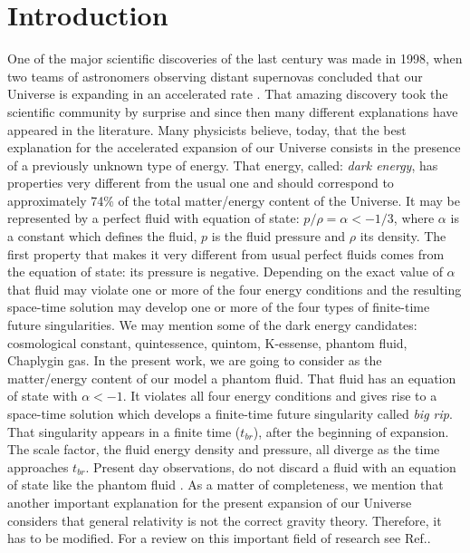 \documentclass[12pt]{article}
\newcommand{\0}{{(0)}}
\newcommand{\1}{{(1)}}
\newcommand{\2}{{(2)}}
\begin{document}

\section{Introduction}
\label{sec:intro}

One of the major scientific discoveries of the last century was made in 1998, when
two teams of astronomers observing distant supernovas concluded that our
Universe is expanding in an accelerated rate \cite{expansion}. That amazing discovery
took the scientific community by surprise and since then many different explanations
have appeared in the literature. Many physicists believe, today, that the best explanation
for the accelerated expansion of our Universe consists in the presence of a previously
unknown type of energy. That energy, called: {\it dark energy}\cite{turner}, has properties very different from the usual 
one and should correspond to approximately 74\% of the total matter/energy content of the Universe\cite{caldwell}.
It may be represented by a perfect fluid with equation of state: $p/\rho = \alpha < -1/3$, 
where $\alpha$ is a constant which defines the fluid, $p$ is the fluid pressure and $\rho$ its
density\cite{odintsov}. The first property that makes it very different from usual perfect fluids
comes from the equation of state: its pressure is negative. Depending on the exact value of
$\alpha$ that fluid may violate one or more of the four energy conditions and the resulting
space-time solution may develop one or more of the four types of finite-time future singularities\cite{odintsov}.
We may mention some of the dark energy candidates: cosmological constant, quintessence, quintom, K-essense, phantom fluid,
Chaplygin gas\cite{Mli}. In the present work, we are going to consider as the matter/energy content of our model
a phantom fluid. That fluid has an equation of state with $\alpha < -1$. It violates all four energy conditions
and gives rise to a space-time solution which develops a finite-time future singularity called {\it big rip}\cite{odintsov}.
That singularity appears in a finite time ($t_{br}$), after the beginning of expansion. The scale factor, the fluid
energy density and pressure, all diverge as the time approaches $t_{br}$\cite{mcinnes}. Present day observations, do not 
discard a fluid with an equation of state like the phantom fluid \cite{odintsov}.
As a matter of completeness, we mention that another important explanation for the
present expansion of our Universe considers that general relativity is not the
correct gravity theory. Therefore, it has to be modified. 
For a review on this important field of research see Ref.\cite{odintsov1}.
\end{document}
